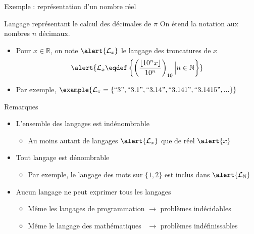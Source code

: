 
\begingroup


\begin{frame}{Exemple : représentation d'un nombre réel}

  \begin{block}{Langage représentant le calcul des décimales de $\pi$}
    On étend la notation  aux nombres $n$ décimaux. 
    \begin{itemize}
    \item Pour $x\in \mathbb{R}$, on note $\alert{\mathcal{L}_{x}}$ le langage des troncatures de $x$
      $$\alert{\mathcal{L}_{x} \eqdef \left\{\left(\frac{\left\lfloor 10^n x \right\rfloor}{10^n} \right)_{10} \Big| n \in \mathbb{N}\right\}}$$
    \item Par exemple, $\example{\mathcal{L}_{\pi} = \left\{\text{``3''}, \text{``3.1''}, \text{``3.14''}, \text{``3.141''}, \text{``3.1415''}, ...   \right\}}$
    \end{itemize}
  \end{block}

  \pause

  \begin{alertblock}{Remarques}
    \begin{itemize}
    \item L'ensemble des langages est indénombrable
      \begin{itemize}
      \item Au moins autant de langages $\alert{\mathcal{L}_{x}}$ que de réel $\alert{x}$
      \end{itemize}
    \item Tout langage est dénombrable
      \begin{itemize}
      \item Par exemple, le langage des mots sur $\{1, 2\}$ est inclus dans $\alert{\mathcal{L}_{\mathbb{N}}}$
      \end{itemize}
    \item Aucun langage ne peut exprimer tous les langages 
      \begin{itemize}
      \item Même les langages de programmation $\rightarrow$ \alert{problèmes indécidables}
      \item Même le langage des mathématiques ~$\rightarrow$ \alert{problèmes indéfinissables}
      \end{itemize}
    \end{itemize}
  \end{alertblock}

\end{frame}

\endgroup
